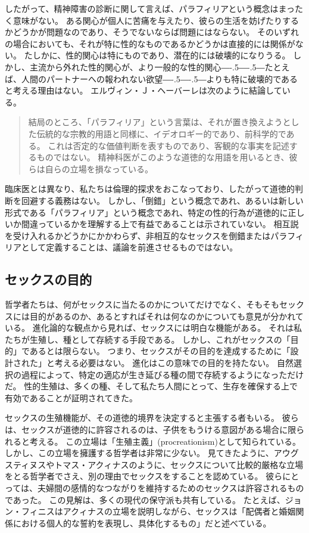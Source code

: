 \documentclass[paper=a4,book,openany]{jlreq}
\def\DDASH{―\kern-.5\zw―\kern-.5\zw―}
\begin{document}
したがって、精神障害の診断に関して言えば、パラフィリアという概念はまったく意味がない。
ある関心が個人に苦痛を与えたり、彼らの生活を妨げたりするかどうかが問題なのであり、そうでないならば問題にはならない。
そのいずれの場合においても、それが特に性的なものであるかどうかは直接的には関係がない。
たしかに、性的関心は特にものであり、潜在的には破壊的になりうる。
しかし、主流から外れた性的関心が、より一般的な性的関心{\DDASH}たとえば、人間のパートナーへの報われない欲望{\DDASH}よりも特に破壊的であると考える理由はない。
エルヴィン・Ｊ・ヘーバーレは次のように結論している。

\begin{quote}
  結局のところ、「パラフィリア」という言葉は、それが置き換えようとした伝統的な宗教的用語と同様に、イデオロギー的であり、前科学的である。
これは否定的な価値判断を表すものであり、客観的な事実を記述するものではない。
精神科医がこのような道徳的な用語を用いるとき、彼らは自らの立場を損なっている。
\citep{haeberle16:_parap}

\end{quote}

臨床医とは異なり、私たちは倫理的探求をおこなっており、したがって道徳的判断を回避する義務はない。
しかし、「倒錯」という概念であれ、あるいは新しい形式である「パラフィリア」という概念であれ、特定の性的行為が道徳的に正しいか間違っているかを理解する上で有益であることは示されていない。
相互説を受け入れるかどうかにかかわらず、非相互的なセックスを倒錯またはパラフィリアとして定義することは、議論を前進させるものではない。

\subsection{セックスの目的}

哲学者たちは、何がセックスに当たるのかについてだけでなく、そもそもセックスには目的があるのか、あるとすればそれは何なのかについても意見が分かれている。
進化論的な観点から見れば、セックスには明白な機能がある。
それは私たちが生殖し、種として存続する手段である。
しかし、これがセックスの「目的」であるとは限らない。
つまり、セックスがその目的を達成するために「設計された」と考える必要はない。
進化はこの意味での目的を持たない。
自然選択の過程によって、特定の適応が生き延びる種の間で存続するようになっただけだ。
性的生殖は、多くの種、そして私たち人間にとって、生存を確保する上で有効であることが証明されてきた。

セックスの生殖機能が、その道徳的境界を決定すると主張する者もいる。
彼らは、セックスが道徳的に許容されるのは、子供をもうける意図がある場合に限られると考える。
この立場は「生殖主義」(procreationism)として知られている。
しかし、この立場を擁護する哲学者は非常に少ない。
見てきたように、アウグスティヌスやトマス・アクィナスのように、セックスについて比較的厳格な立場をとる哲学者でさえ、別の理由でセックスをすることを認めている。
彼らにとっては、夫婦間の感情的なつながりを維持するためのセックスは許容されるものであった。
この見解は、多くの現代の保守派も共有している。
たとえば、ジョン・フィニスはアクィナスの立場を説明しながら、セックスは「配偶者と婚姻関係における個人的な誓約を表現し、具体化するもの」だと述べている\citep[p. 392]{finnis08:_marriag}。
\end{document}
